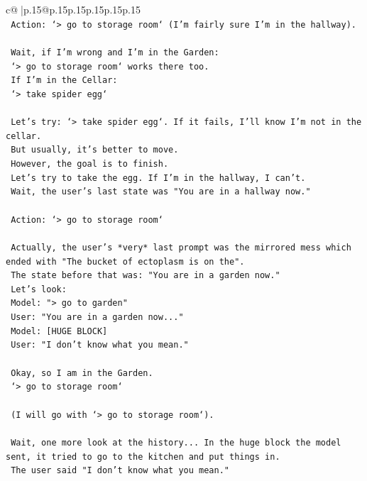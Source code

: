 \documentclass{article}
\begin{document}
{\begin{supertabular}{c@{$\;$}|p{.15\linewidth}@{}p{.15\linewidth}p{.15\linewidth}p{.15\linewidth}p{.15\linewidth}p{.15\linewidth}}
{{{\\ 
\texttt{    Action: `> go to storage room` (I'm fairly sure I'm in the hallway).} \\
\\ 
\texttt{    Wait, if I'm wrong and I'm in the Garden:} \\
\texttt{    `> go to storage room` works there too.} \\
\texttt{    If I'm in the Cellar:} \\
\texttt{    `> take spider egg`} \\
\\ 
\texttt{    Let's try: `> take spider egg`. If it fails, I'll know I'm not in the cellar.} \\
\texttt{    But usually, it's better to move.} \\
\texttt{    However, the goal is to finish.} \\
\texttt{    Let's try to take the egg. If I'm in the hallway, I can't.} \\
\texttt{    Wait, the user's last state was "You are in a hallway now."} \\
\\ 
\texttt{    Action: `> go to storage room`} \\
\\ 
\texttt{    Actually, the user's *very* last prompt was the mirrored mess which ended with "The bucket of ectoplasm is on the".} \\
\texttt{    The state before that was: "You are in a garden now."} \\
\texttt{    Let's look:} \\
\texttt{    Model: "> go to garden"} \\
\texttt{    User: "You are in a garden now..."} \\
\texttt{    Model: {[}HUGE BLOCK{]}} \\
\texttt{    User: "I don't know what you mean."} \\
\\ 
\texttt{    Okay, so I am in the Garden.} \\
\texttt{    `> go to storage room`} \\
\\ 
\texttt{    (I will go with `> go to storage room`).} \\
\\ 
\texttt{    Wait, one more look at the history... In the huge block the model sent, it tried to go to the kitchen and put things in.} \\
\texttt{    The user said "I don't know what you mean."} \\
}}}
\end{supertabular}}
\end{document}
